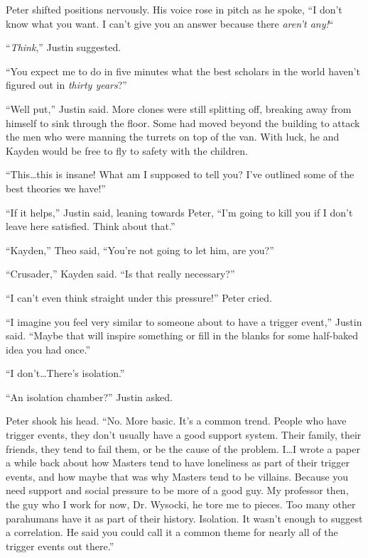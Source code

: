 Peter shifted positions nervously.  His voice rose in pitch as he spoke, ``I don't know what you want.  I can't give you an answer because there \emph{aren't any!}``



``\emph{Think},'' Justin suggested.



``You expect me to do in five minutes what the best scholars in the world haven't figured out in \emph{thirty years}?''



``Well put,'' Justin said.  More clones were still splitting off, breaking away from himself to sink through the floor.  Some had moved beyond the building to attack the men who were manning the turrets on top of the van.  With luck, he and Kayden would be free to fly to safety with the children.



``This\ldots this is insane!  What am I supposed to tell you?  I've outlined some of the best theories we have!''



``If it helps,'' Justin said, leaning towards Peter, ``I'm going to kill you if I don't leave here satisfied.  Think about that.''



``Kayden,'' Theo said, ``You're not going to let him, are you?''



``Crusader,'' Kayden said.  ``Is that really necessary?''



``I can't even think straight under this pressure!'' Peter cried.



``I imagine you feel very similar to someone about to have a trigger event,'' Justin said.  ``Maybe that will inspire something or fill in the blanks for some half-baked idea you had once.''



``I don't\ldots There's isolation.''



``An isolation chamber?'' Justin asked.



Peter shook his head.  ``No.  More basic.  It's a common trend.  People who have trigger events, they don't usually have a good support system.  Their family, their friends, they tend to fail them, or be the cause of the problem.  I\ldots I wrote a paper a while back about how Masters tend to have loneliness as part of their trigger events, and how maybe that was why Masters tend to be villains.  Because you need support and social pressure to be more of a good guy.  My professor then, the guy who I work for now, Dr. Wysocki, he tore me to pieces.  Too many other parahumans have it as part of their history.  Isolation.  It wasn't enough to suggest a correlation.  He said you could call it a common theme for nearly all of the trigger events out there.''



